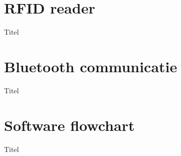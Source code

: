 \documentclass[t,12pt,english
\ifx\beamermode\undefined\else,\beamermode\fi
]{beamer}
\begin{document}
\section{RFID reader}
\begin{frame}{Titel}

\end{frame}
\section{Bluetooth communicatie}
\begin{frame}{Titel}

\end{frame}
\section{Software flowchart}
\begin{frame}{Titel}

\end{frame}
\end{document}
